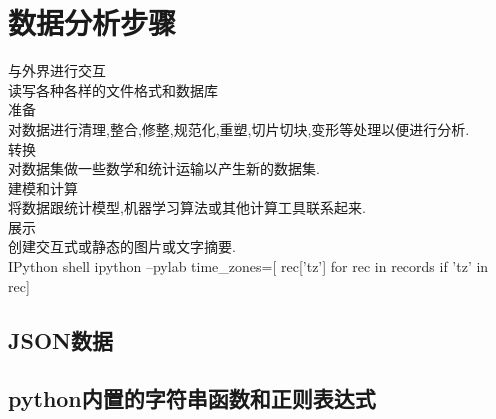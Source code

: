 \chapter{数据分析步骤}
与外界进行交互\\
读写各种各样的文件格式和数据库\\
准备\\
对数据进行清理,整合,修整,规范化,重塑,切片切块,变形等处理以便进行分析.\\
转换\\
对数据集做一些数学和统计运输以产生新的数据集.\\
建模和计算\\
将数据跟统计模型,机器学习算法或其他计算工具联系起来.\\
展示\\
创建交互式或静态的图片或文字摘要.\\
IPython shell
ipython --pylab
time\_zones=[ rec['tz'] for rec in records if 'tz' in rec]
\section{JSON数据}

\section{python内置的字符串函数和正则表达式}
